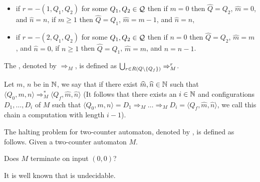 \begin{definition}
\begin{itemize}
		\item if $r=-(1,Q_1,Q_2)$ for some $Q_1,Q_2\in \mathcal{Q}$ then
\subitem if $m=0$ then $\widehat{Q}=Q_2$, $\widehat{m}=0$, and $\widehat{n}=n$,
\subitem if $m\geq1$ then $\widehat{Q}=Q_1$, $\widehat{m}=m-1$, and $\widehat{n}=n$,
		\item if $r=-(2,Q_1,Q_2)$ for some $Q_1,Q_2\in \mathcal{Q}$ then
\subitem if $n=0$ then $\widehat{Q}=Q_2$, $\widehat{m}=m$, and $\widehat{n}=0$,
\subitem if $n\geq1$ then $\widehat{Q}=Q_1$, $\widehat{m}=m$, and $\widehat{n}=n-1$.
	\end{itemize}
	The , denoted by $\Rightarrow_M$, is defined as $\bigcup_{r\in R(Q\setminus\{Q_f\})}\Rightarrow^r_M$.%
		
	Let $m$, $n$ be in $\mathbb{N}$, we say that  if there exist $\widehat{m},\widehat{n}\in\mathbb{N}$ such that $\langle Q_0,m,n\rangle\Rightarrow^*_M\langle Q_f,\widehat{m},\widehat{n}\rangle$ (It follows that there exists an $i\in\mathbb{N}$ and configurations $D_1,\dots,D_i$ of $M$ such that $\langle Q_0,m,n\rangle= D_1\Rightarrow_M\dots\Rightarrow_M D_i=\langle Q_f,\widehat{m},\widehat{n}\rangle$, we call this chain a computation with length $i-1$).
\end{definition}
\begin{definition}\label{def.2.25}
	The halting problem for two-counter automaton, denoted by \autHalt{}, is defined as follows.
	Given a two-counter automaton $M$. 
	\begin{center}
		Does $M$ terminate on input $(0,0)$?
	\end{center}
\end{definition}
It is well known that \autHalt{} is undecidable. %

